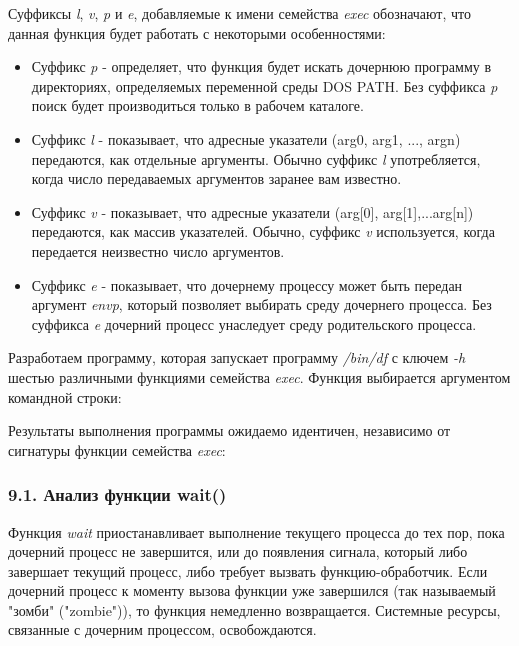 \documentclass[14pt,a4paper,report]{report}
\begin{document}
Суффиксы \emph{l}, \emph{v}, \emph{p} и \emph{e}, добавляемые к имени семейства \emph{exec} обозначают,   что  данная  функция  будет работать с некоторыми особенностями:

\begin{itemize}
	\item Суффикс \emph{p} - определяет, что функция будет искать дочернюю программу в директориях, определяемых переменной среды DOS PATH. Без суффикса \emph{p}  поиск будет  производиться только в рабочем каталоге.
	\item Суффикс \emph{l} - показывает, что адресные указатели (arg0, arg1, ..., argn) передаются, как отдельные аргументы. Обычно суффикс \emph{l} употребляется, когда число передаваемых аргументов заранее вам известно.
	\item Суффикс \emph{v} - показывает, что адресные указатели  (arg[0], arg[1],...arg[n]) передаются, как массив указателей. Обычно, суффикс \emph{v} используется, когда передается неизвестно число аргументов.
	\item Суффикс \emph{e} - показывает, что дочернему процессу может быть передан аргумент \emph{envp},   который позволяет выбирать среду дочернего процесса. Без суффикса \emph{e} дочерний процесс унаследует среду родительского процесса.
\end{itemize}

Разработаем программу, которая запускает программу \emph{/bin/df} с ключем \emph{-h} шестью различными функциями семейства \emph{exec}. Функция выбирается аргументом командной строки:



Результаты выполнения программы ожидаемо идентичен, независимо от сигнатуры функции семейства \emph{exec}:



\subsubsection{9.1. Анализ функции wait()}

Функция \emph{wait} приостанавливает выполнение текущего процесса до тех пор, пока дочерний процесс не завершится, или до появления сигнала, который либо завершает текущий процесс, либо требует вызвать функцию-обработчик. Если дочерний процесс к моменту вызова функции уже завершился (так называемый "зомби" ("zombie")), то функция немедленно возвращается. Системные ресурсы, связанные с дочерним процессом, освобождаются. 
\end{document}
